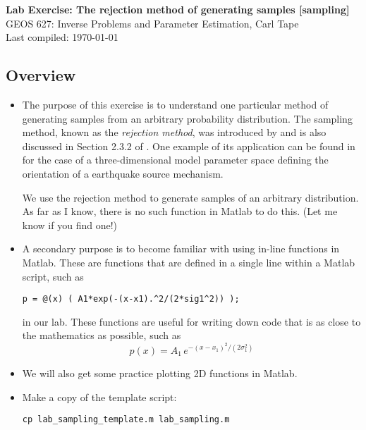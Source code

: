 \documentclass[11pt,titlepage,fleqn]{article}
\begin{document}

\begin{spacing}{1.2}
\centering
{\large \bf Lab Exercise: The rejection method of generating samples [sampling]} \\
GEOS 627: Inverse Problems and Parameter Estimation, Carl Tape \\
Last compiled: \today
\end{spacing}


\subsection*{Overview}

\begin{itemize}
\item The purpose of this exercise is to understand one particular method of generating samples from an arbitrary probability distribution. The sampling method, known as the {\em rejection method}, was introduced by \citet{vonNeumann1951} and is also discussed in Section 2.3.2 of \citet{Tarantola2005}. One example of its application can be found in \citet{SilwalTape2016} for the case of a three-dimensional model parameter space defining the orientation of a earthquake source mechanism.

We use the rejection method to generate samples of an arbitrary distribution. As far as I know, there is no such function in Matlab to do this. (Let me know if you find one!)

\item A secondary purpose is to become familiar with using in-line functions in Matlab. These are functions that are defined in a single line within a Matlab script, such as

\verb+p = @(x) ( A1*exp(-(x-x1).^2/(2*sig1^2)) );+

in our lab. These functions are useful for writing down code that is as close to the mathematics as possible, such as
%
\begin{equation}
p(x) = A_1\,e^{-(x-x_1)^2/(2\sigma_1^2)}
\end{equation}

\item We will also get some practice plotting 2D functions in Matlab.

\item Make a copy of the template script:
%
\begin{verbatim}
cp lab_sampling_template.m lab_sampling.m
\end{verbatim}

\end{itemize}
\end{document}
